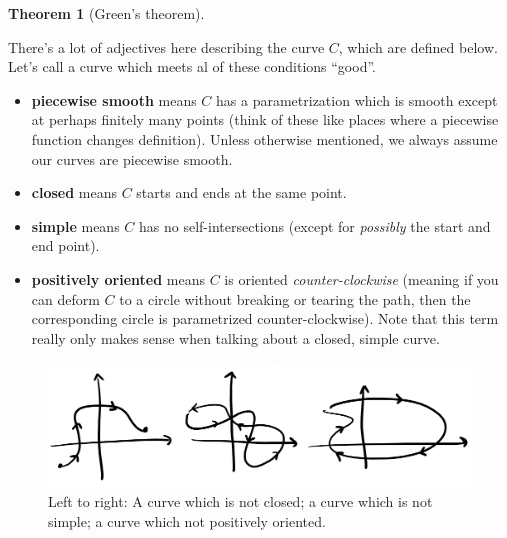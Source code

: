 \documentclass[12pt]{article}
\numberwithin{equation}{subsection}
\numberwithin{figure}{subsection}
\newtheorem{thm}[subsection]{Theorem}
\theoremstyle{note}
\begin{document}
{\begin{thm}[Green's theorem]
\end{thm}




There's a lot of adjectives here describing the curve $C$, which are defined below. Let's call a curve which meets al of these conditions ``good''.
\begin{itemize}

	\item \textbf{piecewise smooth} means $C$ has a parametrization which is smooth except at perhaps finitely many points (think of these like places where a piecewise function changes definition). Unless otherwise mentioned, we always assume our curves are piecewise smooth. 
	\item \textbf{closed} means $C$ starts and ends at the same point.
	\item \textbf{simple} means $C$ has no self-intersections (except for \textit{possibly} the start and end point).
	\item \textbf{positively oriented} means $C$ is oriented \textit{counter-clockwise} (meaning if you can deform $C$ to a circle without breaking or tearing the path, then the corresponding circle is parametrized counter-clockwise). Note that this term really only makes sense when talking about a closed, simple curve. 
\end{itemize}

\begin{figure}[h!]
\centering
\includegraphics[width=150mm]{Images/curves-not-green}
\caption{Left to right: A curve which is not closed; a curve which is not simple; a curve which not positively oriented.}
\label{fig-curves-ex}
\end{figure}


}
\end{document}
